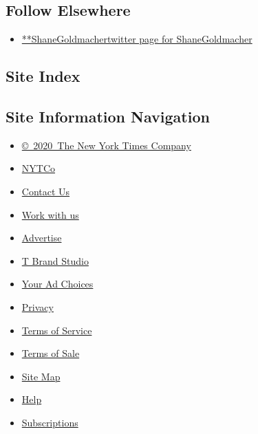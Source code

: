 \hypertarget{follow-elsewhere}{%
\subsection{Follow Elsewhere}\label{follow-elsewhere}}

\begin{itemize}
\tightlist
\item
  \href{https://twitter.com/ShaneGoldmacher}{**ShaneGoldmachertwitter
  page for ShaneGoldmacher}
\end{itemize}

\hypertarget{site-index}{%
\subsection{Site Index}\label{site-index}}

\hypertarget{site-information-navigation}{%
\subsection{Site Information
Navigation}\label{site-information-navigation}}

\begin{itemize}
\tightlist
\item
  \href{https://help.nytimes.com/hc/en-us/articles/115014792127-Copyright-notice}{©~2020~The
  New York Times Company}
\end{itemize}

\begin{itemize}
\tightlist
\item
  \href{https://www.nytco.com/}{NYTCo}
\item
  \href{https://help.nytimes.com/hc/en-us/articles/115015385887-Contact-Us}{Contact
  Us}
\item
  \href{https://www.nytco.com/careers/}{Work with us}
\item
  \href{https://nytmediakit.com/}{Advertise}
\item
  \href{http://www.tbrandstudio.com/}{T Brand Studio}
\item
  \href{https://www.nytimes.com/privacy/cookie-policy\#how-do-i-manage-trackers}{Your
  Ad Choices}
\item
  \href{https://www.nytimes.com/privacy}{Privacy}
\item
  \href{https://help.nytimes.com/hc/en-us/articles/115014893428-Terms-of-service}{Terms
  of Service}
\item
  \href{https://help.nytimes.com/hc/en-us/articles/115014893968-Terms-of-sale}{Terms
  of Sale}
\item
  \href{https://spiderbites.nytimes.com}{Site Map}
\item
  \href{https://help.nytimes.com/hc/en-us}{Help}
\item
  \href{https://www.nytimes.com/subscription?campaignId=37WXW}{Subscriptions}
\end{itemize}
